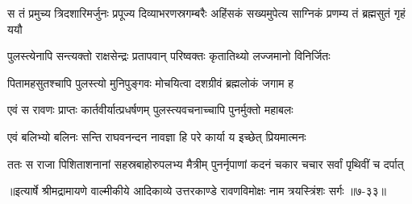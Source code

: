 \twolineshloka
{स तं प्रमुच्य त्रिदशारिमर्जुनः प्रपूज्य दिव्याभरणस्रगम्बरैः}
{अहिंसकं सख्यमुपेत्य साग्निकं प्रणम्य तं ब्रह्मसुतं गृहं ययौ} %

\twolineshloka
{पुलस्त्येनापि सन्त्यक्तो राक्षसेन्द्रः प्रतापवान्}
{परिष्वक्तः कृतातिथ्यो लज्जमानो विनिर्जितः} %

\twolineshloka
{पितामहसुतश्चापि पुलस्त्यो मुनिपुङ्गवः}
{मोचयित्वा दशग्रीवं ब्रह्मलोकं जगाम ह} %

\twolineshloka
{एवं स रावणः प्राप्तः कार्तवीर्यात्प्रधर्षणम्}
{पुलस्त्यवचनाच्चापि पुनर्मुक्तो महाबलः} %

\twolineshloka
{एवं बलिभ्यो बलिनः सन्ति राघवनन्दन}
{नावज्ञा हि परे कार्या य इच्छेत् प्रियमात्मनः} %

\twolineshloka
{ततः स राजा पिशिताशनानां सहस्रबाहोरुपलभ्य मैत्रीम्}
{पुनर्नृपाणां कदनं चकार चचार सर्वां पृथिवीं च दर्पात्} %


॥इत्यार्षे श्रीमद्रामायणे वाल्मीकीये आदिकाव्ये उत्तरकाण्डे रावणविमोक्षः नाम त्रयस्त्रिंशः सर्गः ॥७-३३॥
